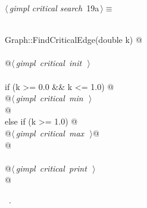 \documentclass[12pt]{article}
\begin{document}
\begin{flushleft} \small
\begin{minipage}{\linewidth}\label{scrap32}\raggedright\small
{} $\langle\,${\itshape gimpl critical search}\nobreak\ {\footnotesize {19a}}$\,\rangle\equiv$
\vspace{-1ex}
\begin{list}{}{} \item
\mbox{}\verb@@\\
\mbox{}\verb@void Graph::FindCriticalEdge(double k) {@\\
\mbox{}\verb@@\\
\mbox{}\verb@    @\hbox{$\langle\,${\itshape gimpl critical init}\nobreak\ {\footnotesize {}}$\,\rangle$}\verb@@\\
\mbox{}\verb@@\\
\mbox{}\verb@    if (k >= 0.0 && k <= 1.0) {@\\
\mbox{}\verb@      @\hbox{$\langle\,${\itshape gimpl critical min}\nobreak\ {\footnotesize {}}$\,\rangle$}\verb@@\\
\mbox{}\verb@    }@\\
\mbox{}\verb@    else if (k >= 1.0) {@\\
\mbox{}\verb@      @\hbox{$\langle\,${\itshape gimpl critical max}\nobreak\ {\footnotesize {}}$\,\rangle$}\verb@  @\\
\mbox{}\verb@    }@\\
\mbox{}\verb@@\\
\mbox{}\verb@    @\hbox{$\langle\,${\itshape gimpl critical print}\nobreak\ {\footnotesize {}}$\,\rangle$}\verb@@\\
\mbox{}\verb@}@\\
\mbox{}\verb@@{\NWsep}
\end{list}
\vspace{-1.5ex}
\footnotesize
\begin{list}{}{\setlength{\itemsep}{-\parsep}\setlength{\itemindent}{-\leftmargin}}
\item \NWtxtMacroRefIn\ .

\item{}
\end{list}
\end{minipage}\vspace{4ex}
\end{flushleft}
\end{document}
